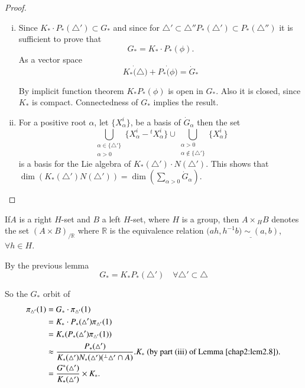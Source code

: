 \begin{proof}
  \begin{enumerate}[(i)]
  \item  Since $K_* \cdot P_* (\triangle') \subset G_*$ and since for
  $\triangle' \subset \triangle'' P_* (\triangle') \subset P_*
  (\triangle'')$ it is sufficient to prove that
  $$
  G_* = K_* \cdot P_* (\phi).
  $$
  As a vector space
  $$
  K_* \dot{(}\triangle)+ P_* \dot{(}\phi) = \dot{G}_*
  $$
  
  By implicit function theorem $K_* P_* (\phi)$ is open in $G_*$. Also
  it is closed, since $K_*$ is compact. Connectedness of $G_*$ implies
  the result.
  
\item For a positive root $\alpha$, let $\{ X^i_\alpha\}$, be a basis
  of $\dot{G}_\alpha$ then the set 
$${\bigcup_{\substack{
      \alpha  \in \{ \triangle'\}\\ \alpha > 0}} \{ X^i_\alpha-
  {}^tX^i_\alpha\} \cup \bigcup_{\substack{\alpha > 0\\ \alpha \notin \{
      \triangle'\}}} \{ X^i_{\alpha}\}}$$ 
is a basis for the Lie algebra of  $K_* (\triangle')\cdot N(\triangle')$. This shows that $\dim (K_*   
  (\triangle')N(\triangle'))= \dim \left(\displaystyle{\mathop{\sum}_{\alpha > 0}}
  \dot{G}_\alpha\right)$.
  \end{enumerate}
\end{proof}

\begin{defi*}
  If\pageoriginale $A$ is a right $H$-set and $B$ a left $H$-set, where $H$ is a
  group, then $A \times{}_H B$ denotes the set $(A \times
  B)_{/\mathbb{R}}$ where $\mathbb{R}$ is the equivalence relation
  $(ah, \underline{h^{-1}b) \sim (a, b)}$, $\forall h \in H$.
\end{defi*}

By the previous lemma
$$
G_* = K_* P_* (\triangle') \quad \forall \triangle' \subset \triangle 
$$

So the $G_*$ orbit of 
\begin{align*}
  \pi_{\triangle'} \text{(1)} & = G_* \cdot
  \pi_{\triangle'} \text{(1)}\\
  & = K_* \cdot P_* (\triangle') \pi_{\triangle'}
  \text{(1)} \\
  & = K_* (P_* (\triangle') \pi_{\triangle'}
  \text{(1)}) \\
  & \approx \frac{P_* (\triangle')}{K_* (\triangle') N_*
    (\triangle')({}^\perp \triangle' \cap A)}. K_* ~\text{(by part
    (iii) of Lemma \ref{chap2:lem2.8})}.\\
  & = \frac{G^*(\triangle')}{K_* (\triangle')} \times K_*.
\end{align*}

